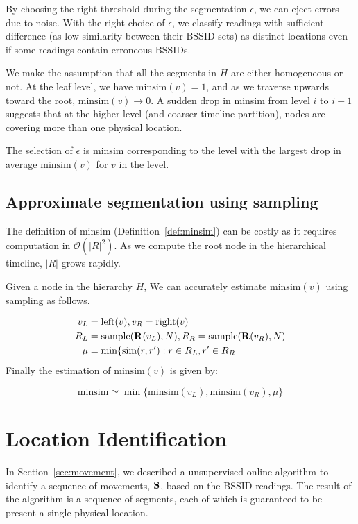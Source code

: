 By choosing the right threshold during the segmentation $\epsilon$, we can eject
errors due to noise.  With the right choice of
$\epsilon$, we classify readings with sufficient difference (as low similarity
between their BSSID sets) as distinct locations even if some readings contain
erroneous BSSIDs.

We make the assumption that all the segments in $H$ are either homogeneous or
not.  At the leaf level, we have $\mathrm{minsim}(v) = 1$, and as we traverse
upwards toward the root, $\mathrm{minsim}(v)\to 0$.  A sudden drop in minsim
from level $i$ to $i+1$ suggests that at the higher level (and coarser timeline
partition), nodes are covering more than one physical location.

The selection of $\epsilon$ is $\mathrm{minsim}$ corresponding to the level with
the largest drop in average $\mathrm{minsim}(v)$ for $v$ in the level.

\subsection{Approximate segmentation using sampling}

The definition of minsim (Definition~\ref{def:minsim}) can be costly as it
requires computation in $\mathcal{O}(|R|^2)$.  As we compute the root node in
the hierarchical timeline, $|R|$ grows rapidly.

Given a node in the hierarchy $H$, We can accurately estimate
$\mathrm{minsim}(v)$ using sampling as follows.

\begin{align*}
v_L &= \mathrm{left}(v), v_R = \mathrm{right}(v)\\
R_L &= \mathrm{sample}(\mathbf{R}(v_L), N), R_R = \mathrm{sample}(\mathbf{R}(v_R), N)\\
\mu &= \mathrm{min}\{\mathrm{sim}(r,r'): r\in R_L, r'\in R_R
\end{align*}
Finally the estimation of $\mathrm{minsim}(v)$ is given by:

$$\mathrm{minsim} \simeq \min\{\mathrm{minsim}(v_L), \mathrm{minsim}(v_R), \mu\}$$

\section{Location Identification}

\label{sec:loc}

In Section~\ref{sec:movement}, we described a unsupervised online algorithm to
identify a sequence of movements, $\mathbf{S}$, based on the BSSID readings.  The result of the
algorithm is a sequence of segments, each of which is guaranteed to be present a
single physical location.

